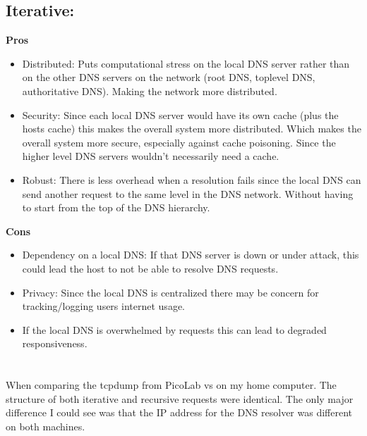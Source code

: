 \documentclass{article}
\begin{document}
\subsection{Iterative: }
\textbf{Pros}
\begin{itemize}
    \item
        Distributed: Puts computational stress on the local DNS server rather than on the other
        DNS servers on the network (root DNS, top\-level DNS, authoritative DNS). 
        Making the network more distributed.
    \item
        Security: Since each local DNS server would have its own cache (plus the hosts cache) this makes the 
        overall system more distributed. Which makes the overall system
        more secure, especially against cache poisoning. Since the 
        higher level DNS servers wouldn't necessarily need a cache.
    \item
        Robust: There is less overhead when a resolution fails since the local DNS can
        send another request to the same level in the DNS network. Without having 
        to start from the top of the DNS hierarchy.

\end{itemize}

\textbf{Cons}

\begin{itemize}
    \item
        Dependency on a local DNS: If that DNS server is down or under attack,
        this could lead the host to not be able to resolve DNS requests.
    \item
        Privacy: Since the local DNS is centralized there may be concern for 
        tracking/logging users internet usage. 
    \item
        If the local DNS is overwhelmed by requests this can lead to degraded 
        responsiveness.
\end{itemize}

\section{}
When comparing the tcpdump from PicoLab vs on my home computer. The structure
of both iterative and recursive requests were identical. The only major difference 
I could see was that the IP address for the DNS resolver was different on both machines.
\end{document}
